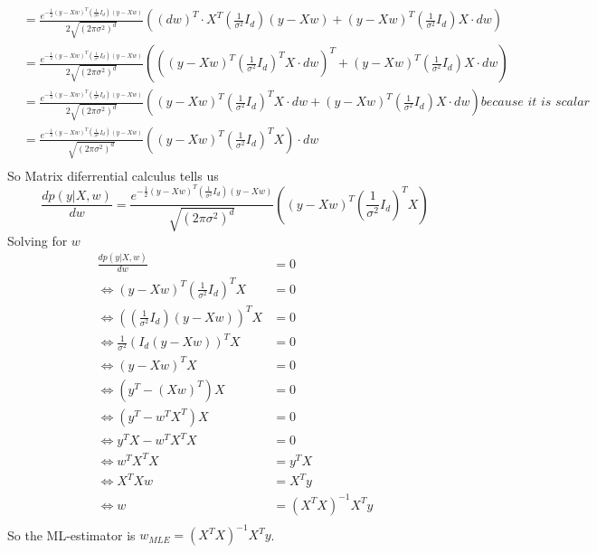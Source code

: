 \documentclass[10pt,a4paper]{article}
\begin{document}
\begin{align*}
               & = \frac{e^{-\frac{1}{2}(y - Xw)^{T}(\frac{1}{\sigma^{2}} I_{d})(y - Xw)}}{2\sqrt{(2 \pi \sigma^{2})^{d}}} \left( (dw)^{T} \cdot X^{T} (\frac{1}{\sigma^{2}} I_{d})(y - Xw) + (y - Xw)^{T}(\frac{1}{\sigma^{2}} I_{d}) X \cdot dw \right)\\
               & = \frac{e^{-\frac{1}{2}(y - Xw)^{T}(\frac{1}{\sigma^{2}} I_{d})(y - Xw)}}{2\sqrt{(2 \pi \sigma^{2})^{d}}} \left( \left( (y - Xw)^{T} (\frac{1}{\sigma^{2}} I_{d})^{T} X \cdot dw \right)^{T} + (y - Xw)^{T}(\frac{1}{\sigma^{2}} I_{d}) X \cdot dw \right)\\
               & = \frac{e^{-\frac{1}{2}(y - Xw)^{T}(\frac{1}{\sigma^{2}} I_{d})(y - Xw)}}{2\sqrt{(2 \pi \sigma^{2})^{d}}} \left( (y - Xw)^{T} (\frac{1}{\sigma^{2}} I_{d})^{T} X \cdot dw + (y - Xw)^{T}(\frac{1}{\sigma^{2}} I_{d}) X \cdot dw \right) \textit{because it is scalar}\\
               & = \frac{e^{-\frac{1}{2}(y - Xw)^{T}(\frac{1}{\sigma^{2}} I_{d})(y - Xw)}}{\sqrt{(2 \pi \sigma^{2})^{d}}} \left( (y - Xw)^{T} (\frac{1}{\sigma^{2}} I_{d})^{T} X \right) \cdot dw\\
\end{align*}
So Matrix diferrential calculus tells us
\begin{equation}
  \frac{dp(y | X, w)}{dw} = \frac{e^{-\frac{1}{2}(y - Xw)^{T}(\frac{1}{\sigma^{2}} I_{d})(y - Xw)}}{\sqrt{(2 \pi \sigma^{2})^{d}}} \left( (y - Xw)^{T} (\frac{1}{\sigma^{2}} I_{d})^{T} X \right)
\end{equation}
Solving for $w$
\begin{align*}
  \frac{dp(y | X, w)}{dw} & = 0\\
  \Leftrightarrow (y - Xw)^{T} (\frac{1}{\sigma^{2}} I_{d})^{T} X & = 0\\
  \Leftrightarrow \left( (\frac{1}{\sigma^{2}} I_{d}) (y - Xw) \right)^{T} X & = 0\\
  \Leftrightarrow \frac{1}{\sigma^{2}} \left( I_{d} (y - Xw) \right)^{T} X & = 0\\
  \Leftrightarrow (y - Xw)^{T} X & = 0\\
  \Leftrightarrow (y^{T} - (Xw)^{T}) X & = 0\\
  \Leftrightarrow (y^{T} - w^{T}X^{T}) X & = 0\\
  \Leftrightarrow y^{T}X - w^{T}X^{T}X & = 0\\
  \Leftrightarrow w^{T}X^{T}X & = y^{T}X\\
  \Leftrightarrow X^{T}Xw & = X^{T}y\\
  \Leftrightarrow w & = (X^{T}X)^{-1}X^{T}y\\
\end{align*}
So the ML-estimator is $w_{MLE} = (X^{T}X)^{-1}X^{T}y$.
\end{document}
